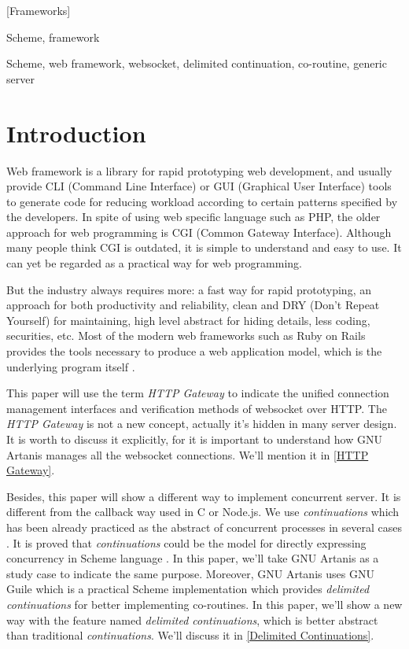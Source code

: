\documentclass[numbers,numberedpars]{sigplanconf}
\begin{document}
[Frameworks]

\terms
Scheme, framework

\keywords
Scheme, web framework, websocket, delimited continuation, co-routine, generic server

\section{Introduction}

Web framework is a library for rapid prototyping web development, and usually provide CLI (Command Line Interface) or
GUI (Graphical User Interface) tools to generate code for reducing workload according to certain patterns specified by the developers.
In spite of using web specific language such as PHP, the older approach for web programming is CGI (Common Gateway Interface).
Although many people think CGI is outdated, it is simple to understand and easy to use.
It can yet be regarded as a practical way for web programming.

But the industry always requires more: a fast way for rapid prototyping, an approach for both productivity and reliability, clean and DRY
(Don't Repeat Yourself) for maintaining, high level abstract for hiding details, less coding, securities, etc.
Most of the modern web frameworks such as Ruby on Rails provides the tools necessary to produce a web application model,
which is the underlying program itself \citep{1597080}. 

This paper will use the term {\it HTTP Gateway} to indicate the unified connection management interfaces and verification methods of websocket
over HTTP. The {\it HTTP Gateway} is not a new concept, actually it's hidden in many server design. It is worth to discuss it explicitly,
for it is important to understand how GNU Artanis manages all the websocket connections. We'll mention it in \ref{HTTP Gateway}.

Besides, this paper will show a different way to implement concurrent server. It is different from the callback way used in C or Node.js.
We use {\it continuations} which has been already practiced as the abstract of concurrent processes in several cases
\citep{Krishnamurthi2007}\citep{Hieb:1990:CC:99164.99178}\citep{Hieb:1994:SUB:184324.184330}.
It is proved that {\it continuations} could be the model for directly expressing concurrency in Scheme language \citep{shivers1997continuations}.
In this paper, we'll take GNU Artanis as a study case to indicate the same purpose. Moreover,
GNU Artanis uses GNU Guile which is a practical Scheme implementation which provides {\it delimited continuations} for better implementing co-routines.
In this paper, we'll show a new way with the feature named {\it delimited continuations}, which is better abstract than traditional {\it continuations}.
We'll discuss it in \ref{Delimited Continuations}.
\end{document}
